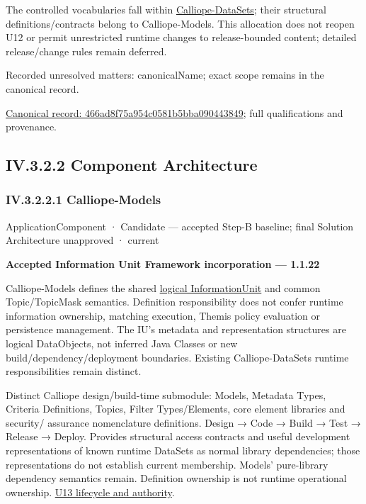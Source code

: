 The controlled vocabularies fall within \hyperref[element:466ad8f75a954c0581b5bba090443849]{Calliope-DataSets};
their structural definitions/contracts belong to Calliope-Models. This allocation
does not reopen U12 or permit unrestricted runtime changes to release-bounded
content; detailed release/change rules remain deferred.


{\small Recorded unresolved matters: canonicalName; exact scope remains in the canonical record.}\par
{\footnotesize \href{../../../../../../../../continuum/application/application-component/466ad8f75a954c0581b5bba090443849.md}{Canonical record: 466ad8f75a954c0581b5bba090443849}; full qualifications and provenance.}\par
\subsection*{IV.3.2.2 Component Architecture}
\label{navigation:IV.3.2.2}

\subsubsection*{IV.3.2.2.1 Calliope-Models}
\label{navigation:IV.3.2.2.1}

\label{element:307b3440a507403f8bc214d290bffb6a}
{\small ApplicationComponent · Candidate — accepted Step-B baseline; final Solution Architecture unapproved · current}\par

\par\medskip\textbf{Accepted Information Unit Framework incorporation — 1.1.22}\par


Calliope-Models defines the shared \hyperref[element:74ec609de1ae498fbf9d13e4ef8c6cbe]{logical InformationUnit} and common Topic/TopicMask semantics. Definition responsibility does not confer runtime information ownership, matching execution, Themis policy evaluation or persistence management. The IU's metadata and representation structures are logical DataObjects, not inferred Java Classes or new build/dependency/deployment boundaries. Existing Calliope-DataSets runtime responsibilities remain distinct.



Distinct Calliope design/build-time submodule: Models, Metadata Types, Criteria
Definitions, Topics, Filter Types/Elements, core element libraries and security/
assurance nomenclature definitions. Design → Code → Build → Test → Release → Deploy.
Provides structural access contracts and useful development representations of
known runtime DataSets as normal library dependencies; those representations do
not establish current membership. Models' pure-library dependency semantics remain.
Definition ownership is not runtime operational ownership. \hyperref[element:307b3440a507403f8bc214d290bffb6a]{U13 lifecycle and authority}.


